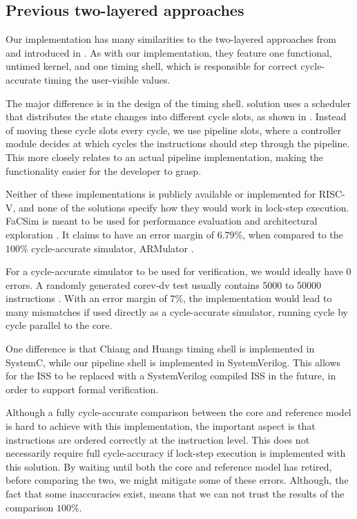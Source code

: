 \subsection{Previous two-layered approaches}

Our implementation has many similarities to the two-layered approaches from \textcite{leeFaCSimFastCycleAccurate2008} and \textcite{chiangEfficientTwolayeredCycleaccurate2009} introduced in . As with our implementation, they feature one functional, untimed kernel, and one timing shell, which is responsible for correct cycle-accurate timing the user-visible values. 

The major difference is in the design of the timing shell. \textcite{chiangEfficientTwolayeredCycleaccurate2009} solution uses a scheduler that distributes the state changes into different cycle slots, as shown in . Instead of moving these cycle slots every cycle, we use pipeline slots, where a controller module decides at which cycles the instructions should step through the pipeline. This more closely relates to an actual pipeline implementation, making the functionality easier for the developer to grasp.

Neither of these implementations is publicly available or implemented for RISC-V, and none of the solutions specify how they would work in lock-step execution.
FaCSim is meant to be used for performance evaluation and architectural exploration \cite{leeFaCSimFastCycleAccurate2008}. It claims to have an error margin of $6.79 \%$, when compared to the $100 \%$ cycle-accurate simulator, ARMulator \cite{leeFaCSimFastCycleAccurate2008}.

For a cycle-accurate simulator to be used for verification, we would ideally have 0 errors. A randomly generated corev-dv test usually contains 5000 to 50000 instructions \cite{openhwgroupCv32e40s2024}. With an error margin of $7 \%$, the implementation would lead to many mismatches if used directly as a cycle-accurate simulator, running cycle by cycle parallel to the core. 


One difference is that Chiang and Huangs timing shell is implemented in SystemC, while our pipeline shell is implemented in SystemVerilog. This allows for the ISS to be replaced with a SystemVerilog compiled ISS in the future, in order to support formal verification.  


Although a fully cycle-accurate comparison between the core and reference model is hard to achieve with this implementation, the important aspect is that instructions are ordered correctly at the instruction level. This does not necessarily require full cycle-accuracy if lock-step execution is implemented with this solution. By waiting until both the core and reference model has retired, before comparing the two, we might mitigate some of these errors. Although, the fact that some inaccuracies exist, means that we can not trust the results of the comparison $100\%$.


